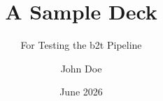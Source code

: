 \documentclass{beamer}
\title{A Sample Deck}
\subtitle{For Testing the b2t Pipeline}
\author{John Doe}
\institute{MIT}
\date{June 2026}
\begin{document}
\begin{frame}
  \titlepage
\end{frame}




\end{document}
